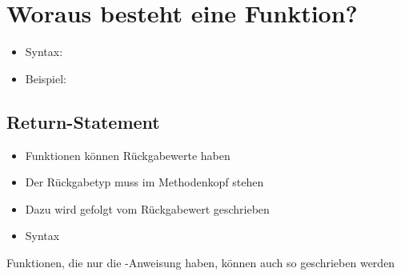 
\subtitle{Kapitel 6: wie Funktionen funktionieren}


\section{Woraus besteht eine Funktion?}
\begin{frame}[c]
    \slidehead
    \begin{itemize}[<+->]
        \item Syntax: 
        \item Beispiel: 
    \end{itemize}
\end{frame}

\subsection{Return-Statement}
\begin{frame}
    \slidehead
    \begin{itemize}
        \item Funktionen können Rückgabewerte haben
        \item Der Rückgabetyp muss im Methodenkopf stehen
        \item Dazu wird  gefolgt vom Rückgabewert geschrieben
        \pause
        \item Syntax 
    \end{itemize}
\end{frame}

\begin{frame}
    \slidehead
    \pause
    Funktionen, die nur die -Anweisung haben, können auch so geschrieben werden
\end{frame}

